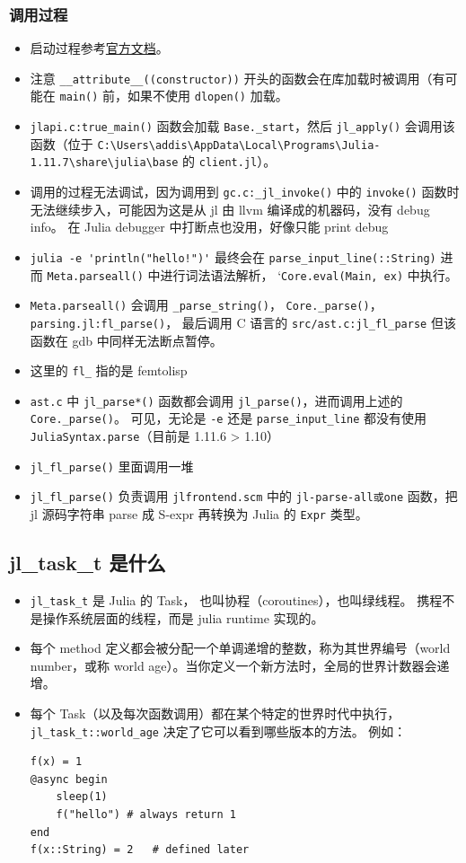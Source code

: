 \subsubsection{调用过程}
\begin{itemize}
\item 启动过程参考\href{https://docs.julialang.org/en/v1/devdocs/init/}{官方文档}。
\item 注意 \verb`__attribute__((constructor))` 开头的函数会在库加载时被调用（有可能在 \verb`main()` 前，如果不使用 \verb`dlopen()` 加载。
\item \verb`jlapi.c:true_main()` 函数会加载 \verb`Base._start`，然后 \verb`jl_apply()` 会调用该函数（位于 \verb`C:\Users\addis\AppData\Local\Programs\Julia-1.11.7\share\julia\base` 的 \verb`client.jl`）。
\item 调用的过程无法调试，因为调用到 \verb`gc.c:_jl_invoke()` 中的 \verb`invoke()` 函数时无法继续步入，可能因为这是从 jl 由 llvm 编译成的机器码，没有 debug info。 在 Julia debugger 中打断点也没用，好像只能 print debug
\item \verb`julia -e 'println("hello!")'` 最终会在 \verb`parse_input_line(::String)` 进而 \verb`Meta.parseall()` 中进行词法语法解析， `\verb`Core.eval(Main, ex)` 中执行。
\item \verb`Meta.parseall()` 会调用 \verb`_parse_string()`， \verb`Core._parse()`， \verb`parsing.jl:fl_parse()`， 最后调用 C 语言的 \verb`src/ast.c:jl_fl_parse` 但该函数在 gdb 中同样无法断点暂停。
\item 这里的 \verb`fl_` 指的是 femtolisp
\item \verb`ast.c` 中 \verb`jl_parse*()` 函数都会调用 \verb`jl_parse()`，进而调用上述的 \verb`Core._parse()`。 可见，无论是 \verb`-e` 还是 \verb`parse_input_line` 都没有使用 \verb`JuliaSyntax.parse`（目前是 1.11.6 > 1.10）
\item \verb`jl_fl_parse()` 里面调用一堆
\item \verb`jl_fl_parse()` 负责调用 \verb`jlfrontend.scm` 中的 \verb`jl-parse-all或one` 函数，把 jl 源码字符串 parse 成 S-expr 再转换为 Julia 的 \verb`Expr` 类型。
\end{itemize}

\subsection{jl_task_t 是什么}
\begin{itemize}
\item \verb`jl_task_t` 是 Julia 的 Task， 也叫协程（coroutines），也叫绿线程。 携程不是操作系统层面的线程，而是 julia runtime 实现的。
\item 每个 method 定义都会被分配一个单调递增的整数，称为其世界编号（world number，或称 world age）。当你定义一个新方法时，全局的世界计数器会递增。
\item 每个 Task（以及每次函数调用）都在某个特定的世界时代中执行， \verb`jl_task_t::world_age` 决定了它可以看到哪些版本的方法。 例如：
\begin{lstlisting}[language=none]
f(x) = 1
@async begin
    sleep(1)
    f("hello") # always return 1
end
f(x::String) = 2   # defined later
\end{lstlisting}
\end{itemize}


